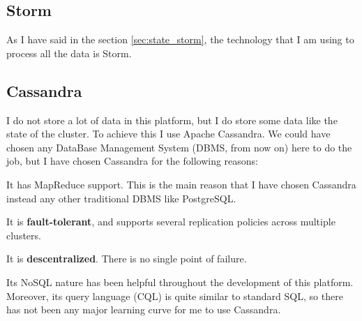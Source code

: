 \subsection{Storm}

As I have said in the section \ref{sec:state_storm}, the technology that I am
using to process all the data is Storm.

\subsection{Cassandra}

I do not store a lot of data in this platform, but I do store some data like
the state of the cluster. To achieve this I use Apache Cassandra. We could
have chosen any DataBase Management System (DBMS, from now on) here to do the
job, but I have chosen Cassandra for the following reasons:

\mylist
  \item It has MapReduce support. This is the main reason that I have chosen
Cassandra instead any other traditional DBMS like PostgreSQL.
  \item It is {\bf fault-tolerant}, and supports several replication policies
across multiple clusters.
  \item It is {\bf descentralized}. There is no single point of failure.
  \item Its NoSQL nature has been helpful throughout the development of this
platform. Moreover, its query language (CQL) is quite similar to standard SQL,
so there has not been any major learning curve for me to use Cassandra.
\mylistend
